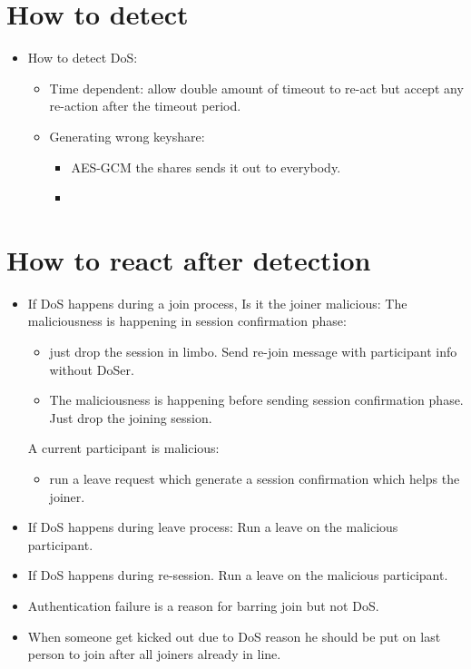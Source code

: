 \documentclass[11pt]{article}
\begin{document}
\section{How to detect}
\label{sec-3}
\begin{itemize}
\item How to detect DoS:
\begin{itemize}
\item Time dependent: allow double amount of timeout to re-act but accept any re-action after the timeout period.
\item Generating wrong keyshare:
\begin{itemize}
\item AES-GCM the shares sends it out to everybody.
\item 
\end{itemize}
\end{itemize}
\end{itemize}

\section{How to react after detection}
\label{sec-4}
\begin{itemize}
\item If DoS happens during a join process, 
Is it the joiner malicious:
   The maliciousness is happening in session confirmation phase:
\begin{itemize}
\item just drop the session in limbo. Send re-join message with participant info without DoSer.
\item The maliciousness is happening before sending session confirmation phase. Just drop the joining session.
\end{itemize}
A current participant is malicious:
\begin{itemize}
\item run a leave request which generate a session confirmation which helps the joiner.
\end{itemize}

\item If DoS happens during leave process:
Run a leave on the malicious participant.

\item If DoS happens during re-session.
Run a leave on the malicious participant.

\item Authentication failure is a reason for barring join but not DoS.

\item When someone get kicked out due to DoS reason he should be put on 
last person to join after all joiners already in line.
\end{itemize}
\end{document}
